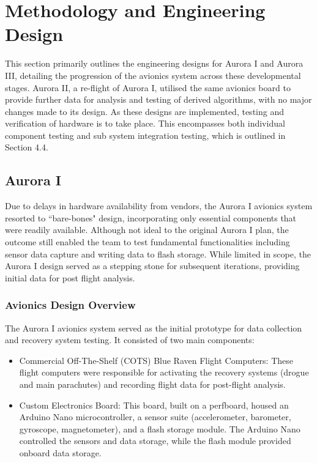 \section{Methodology and Engineering Design}
This section primarily outlines the engineering designs for Aurora I and Aurora III, detailing the progression of the avionics system across these developmental stages. Aurora II, a re-flight of Aurora I, utilised the same avionics board to provide further data for analysis and testing of derived algorithms, with no major changes made to its design. As these designs are implemented, testing and verification of hardware is to take place. This encompasses both individual component testing and sub system integration testing, which is outlined in Section 4.4. 

\subsection{Aurora I }
Due to delays in hardware availability from vendors, the Aurora I avionics system resorted to “bare-bones" design, incorporating only essential components that were readily available. Although not ideal to the original Aurora I plan, the outcome still enabled the team to test fundamental functionalities including sensor data capture and writing data to flash storage. While limited in scope, the Aurora I design served as a stepping stone for subsequent iterations, providing initial data for post flight analysis. 

\subsubsection{Avionics Design Overview}
The Aurora I avionics system served as the initial prototype for data collection and recovery system testing. It consisted of two main components: 
\begin{itemize}
  \item Commercial Off-The-Shelf (COTS) Blue Raven Flight Computers: These flight computers were responsible for activating the recovery systems (drogue and main parachutes) and recording flight data for post-flight analysis. 
  \item Custom Electronics Board: This board, built on a perfboard, housed an Arduino Nano microcontroller, a sensor suite (accelerometer, barometer, gyroscope, magnetometer), and a flash storage module. The Arduino Nano controlled the sensors and data storage, while the flash module provided onboard data storage. 
\end{itemize}

